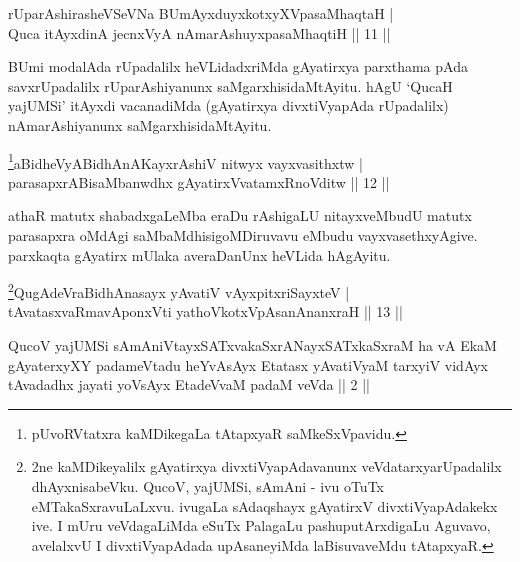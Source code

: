 \begin{shl}
rUparAshirasheVSeVNa BUmAyxduyxkotxyXVpasaMhaqtaH | \\
Quca itAyxdinA jecnxVyA nAmarAshuyxpasaMhaqtiH \hfill ||  11 || 
\end{shl}

\begin{artha} 
BUmi modalAda rUpadalilx heVLidadxriMda gAyatirxya parxthama pAda 
savxrUpadalilx rUparAshiyanunx saMgarxhisidaMtAyitu. hAgU `QucaH 
yajUMSi' itAyxdi vacanadiMda (gAyatirxya divxtiVyapAda rUpadalilx) 
nAmarAshiyanunx saMgarxhisidaMtAyitu.
\end{artha}



\begin{shl}
\footnote{pUvoRVtatxra kaMDikegaLa tAtapxyaR saMkeSxVpavidu.}aBidheVyABidhAnAKayxrAshiV nitwyx vayxvasithxtw | \\
parasapxrABisaMbanwdhx gAyatirxVvatamxRnoVditw \hfill ||  12 ||
\end{shl}

\begin{artha} 
athaR matutx shabadxgaLeMba eraDu rAshigaLU nitayxveMbudU matutx 
parasapxra oMdAgi saMbaMdhisigoMDiruvavu eMbudu vayxvasethxyAgive. 
parxkaqta gAyatirx mUlaka averaDanUnx heVLida hAgAyitu.
\end{artha}



\begin{shl}
\footnote{2ne kaMDikeyalilx gAyatirxya divxtiVyapAdavanunx 
veVdatarxyarUpadalilx dhAyxnisabeVku. QucoV, yajUMSi, sAmAni - ivu 
oTuTx eMTakaSxravuLaLxvu. ivugaLa sAdaqshayx gAyatirxV 
divxtiVyapAdakekx ive. I mUru veVdagaLiMda eSuTx PalagaLu 
pashuputArxdigaLu Aguvavo, avelalxvU I divxtiVyapAdada upAsaneyiMda 
laBisuvaveMdu tAtapxyaR.}QugAdeVraBidhAnasayx yAvatiV vAyxpitxriSayxteV | \\
tAvatasxvaRmavAponxVti yathoVkotxVpAsanAnanxraH \hfill ||  13 || 
\end{shl}

\begin{kandikeshl}
QucoV yajUMSi sAmAniVtayxSATxvakaSxrANayxSATxkaSxraM ha vA EkaM gAyaterxyXY padameVtadu heYvAsAyx Etatasx yAvatiVyaM tarxyiV vidAyx tAvadadhx jayati yoV\s sAyx EtadeVvaM padaM veVda || 2 ||
\end{kandikeshl}

